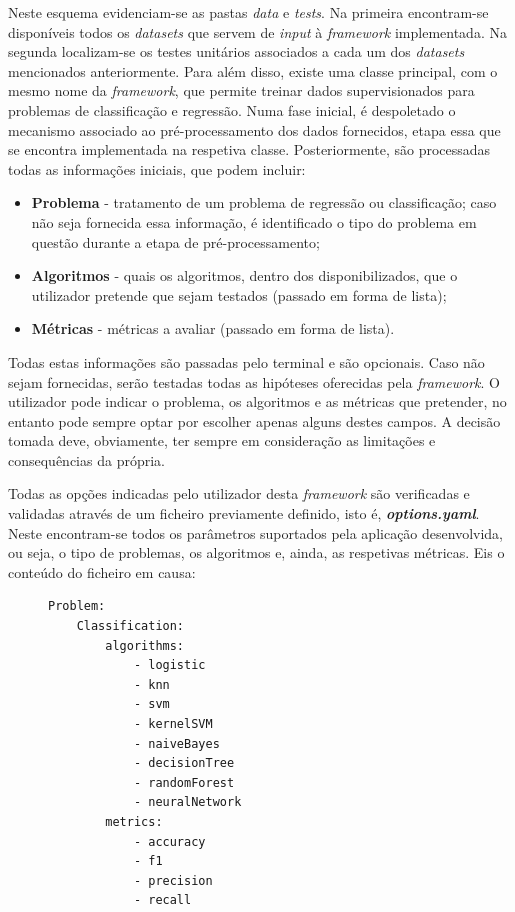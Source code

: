 \documentclass[a4paper]{report}
\begin{document}
{	Neste esquema evidenciam-se as pastas \textsl{data} e \textsl{tests}.
	Na primeira encontram-se disponíveis todos os \textit{datasets} que servem de \textit{input} à \textit{framework} implementada.
	Na segunda localizam-se os testes unitários associados a cada um dos \textit{datasets} mencionados anteriormente.
	Para além disso, existe uma classe principal, com o mesmo nome da \textit{framework}, que permite treinar dados supervisionados para problemas de classificação e regressão.
	Numa fase inicial, é despoletado o mecanismo associado ao pré-processamento dos dados fornecidos, etapa essa que se encontra implementada na respetiva classe.
	Posteriormente, são processadas todas as informações iniciais, que podem incluir:
	\begin{itemize}
		\item \textbf{Problema} - tratamento de um problema de regressão ou classificação; caso não seja fornecida essa informação, é identificado o tipo do problema em questão durante a etapa de pré-processamento;
		\item \textbf{Algoritmos} - quais os algoritmos, dentro dos disponibilizados, que o utilizador pretende que sejam testados (passado em forma de lista);
		\item \textbf{Métricas} - métricas a avaliar (passado em forma de lista).
	\end{itemize}

	Todas estas informações são passadas pelo terminal e são opcionais. Caso não sejam fornecidas, serão testadas todas as hipóteses oferecidas pela \textit{framework}.
    O utilizador pode indicar o problema, os algoritmos e as métricas que pretender, no entanto pode sempre optar por escolher apenas alguns destes campos.
    A decisão tomada deve, obviamente, ter sempre em consideração as limitações e consequências da própria.
    
    Todas as opções indicadas pelo utilizador desta \textit{framework} são verificadas e validadas através de um ficheiro previamente definido, isto é, \textbf{\textsl{options.yaml}}.
	Neste encontram-se todos os parâmetros suportados pela aplicação desenvolvida, ou seja, o tipo de problemas, os algoritmos e, ainda, as respetivas métricas.
	Eis o conteúdo do ficheiro em causa:
    \begin{figure}[H]
        \centering
        \begin{verbatim}
Problem:
    Classification:
        algorithms:
            - logistic
            - knn
            - svm
            - kernelSVM
            - naiveBayes
            - decisionTree
            - randomForest
            - neuralNetwork
        metrics:
            - accuracy
            - f1
            - precision
            - recall


\end{verbatim}
\end{figure}}
\end{document}
